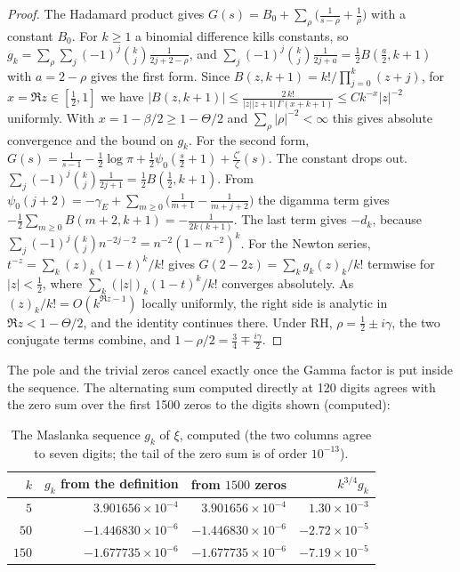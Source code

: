\begin{proof}
The Hadamard product gives $G(s)=B_0+\sum_\rho\big(\frac1{s-\rho}+\frac1\rho\big)$ with a constant $B_0$. For $k\ge1$ a binomial difference kills constants, so $g_k=\sum_\rho\sum_j(-1)^j\binom kj\frac1{2j+2-\rho}$, and $\sum_j(-1)^j\binom kj\frac1{2j+a}=\tfrac12B(\tfrac a2,k+1)$ with $a=2-\rho$ gives the first form. Since $B(z,k+1)=k!/\prod_{j=0}^k(z+j)$, for $x=\Re z\in[\tfrac12,1]$ we have $|B(z,k+1)|\le\frac{2\,k!}{|z||z+1|\,\Gamma(x+k+1)}\le Ck^{-x}|z|^{-2}$ uniformly. With $x=1-\beta/2\ge1-\Theta/2$ and $\sum_\rho|\rho|^{-2}<\infty$ this gives absolute convergence and the bound on $g_k$. For the second form, $G(s)=\frac1{s-1}-\tfrac12\log\pi+\tfrac12\psi_0(\tfrac s2+1)+\frac{\zeta'}{\zeta}(s)$. The constant drops out. $\sum_j(-1)^j\binom kj\frac1{2j+1}=\tfrac12B(\tfrac12,k+1)$. From $\psi_0(j+2)=-\gamma_E+\sum_{m\ge0}\big(\frac1{m+1}-\frac1{m+j+2}\big)$ the digamma term gives $-\tfrac12\sum_{m\ge0}B(m+2,k+1)=-\frac1{2k(k+1)}$. The last term gives $-d_k$, because $\sum_j(-1)^j\binom kjn^{-2j-2}=n^{-2}(1-n^{-2})^k$. For the Newton series, $t^{-z}=\sum_k(z)_k(1-t)^k/k!$ gives $G(2-2z)=\sum_kg_k(z)_k/k!$ termwise for $|z|<\tfrac12$, where $\sum_k(|z|)_k(1-t)^k/k!$ converges absolutely. As $(z)_k/k!=O(k^{\Re z-1})$ locally uniformly, the right side is analytic in $\Re z<1-\Theta/2$, and the identity continues there. Under RH, $\rho=\frac12\pm i\gamma$, the two conjugate terms combine, and $1-\rho/2=\frac34\mp\frac{i\gamma}2$.
\end{proof}

The pole and the trivial zeros cancel exactly once the Gamma factor is put inside the sequence. The alternating sum computed directly at 120 digits agrees with the zero sum over the first 1500 zeros to the digits shown (computed):

\begin{table}[ht]
\centering\small
\begin{tabular}{rrrr}
\toprule
$k$ & $g_k$ from the definition & from $1500$ zeros & $k^{3/4}g_k$\\
\midrule
$5$ & $3.901656\times10^{-4}$ & $3.901656\times10^{-4}$ & $1.30\times10^{-3}$\\
$50$ & $-1.446830\times10^{-6}$ & $-1.446830\times10^{-6}$ & $-2.72\times10^{-5}$\\
$150$ & $-1.677735\times10^{-6}$ & $-1.677735\times10^{-6}$ & $-7.19\times10^{-5}$\\
\bottomrule
\end{tabular}
\caption{The Maslanka sequence $g_k$ of $\xi$, computed (the two columns agree to seven digits; the tail of the zero sum is of order $10^{-13}$).}\label{mh:tab:gk}
\end{table}

